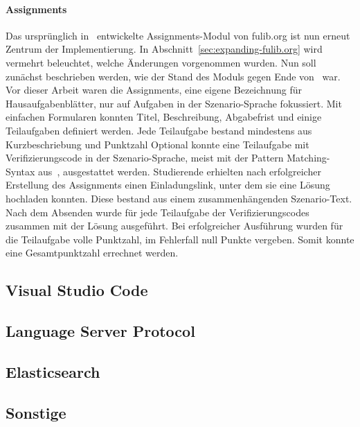 \paragraph{Assignments}
Das ursprünglich in~\cite{bachelor-thesis} entwickelte Assignments-Modul von fulib.org ist nun erneut Zentrum der Implementierung.
In Abschnitt~\ref{sec:expanding-fulib.org} wird vermehrt beleuchtet, welche Änderungen vorgenommen wurden.
Nun soll zunächst beschrieben werden, wie der Stand des Moduls gegen Ende von~\cite{bachelor-thesis} war.
Vor dieser Arbeit waren die Assignments, eine eigene Bezeichnung für Hausaufgabenblätter, nur auf Aufgaben in der Szenario-Sprache fokussiert.
Mit einfachen Formularen konnten Titel, Beschreibung, Abgabefrist und einige Teilaufgaben definiert werden.
Jede Teilaufgabe bestand mindestens aus Kurzbeschriebung und Punktzahl
Optional konnte eine Teilaufgabe mit Verifizierungscode in der Szenario-Sprache, meist mit der Pattern Matching-Syntax aus~\cite{bachelor-thesis}, ausgestattet werden.
Studierende erhielten nach erfolgreicher Erstellung des Assignments einen Einladungslink, unter dem sie eine Lösung hochladen konnten.
Diese bestand aus einem zusammenhängenden Szenario-Text.
Nach dem Absenden wurde für jede Teilaufgabe der Verifizierungscodes zusammen mit der Lösung ausgeführt.
Bei erfolgreicher Ausführung wurden für die Teilaufgabe volle Punktzahl, im Fehlerfall null Punkte vergeben.
Somit konnte eine Gesamtpunktzahl errechnet werden.

\subsection{Visual Studio Code}\label{subsec:visual-studio-code}


\subsection{Language Server Protocol}\label{subsec:language-server-protocol}


\subsection{Elasticsearch}\label{subsec:elasticsearch}


\subsection{Sonstige}\label{subsec:other-libraries}


